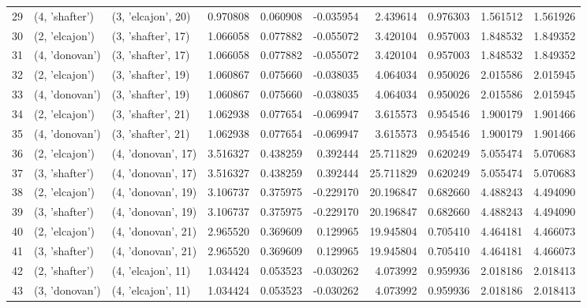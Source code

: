 \begin{tabular}{lllrrrrrrr}
29 &   (4, 'shafter') &  (3, 'elcajon', 20) &  0.970808 &   0.060908 & -0.035954 &   2.439614 &  0.976303 &   1.561512 &  1.561926 \\
30 &   (2, 'elcajon') &  (3, 'shafter', 17) &  1.066058 &   0.077882 & -0.055072 &   3.420104 &  0.957003 &   1.848532 &  1.849352 \\
31 &   (4, 'donovan') &  (3, 'shafter', 17) &  1.066058 &   0.077882 & -0.055072 &   3.420104 &  0.957003 &   1.848532 &  1.849352 \\
32 &   (2, 'elcajon') &  (3, 'shafter', 19) &  1.060867 &   0.075660 & -0.038035 &   4.064034 &  0.950026 &   2.015586 &  2.015945 \\
33 &   (4, 'donovan') &  (3, 'shafter', 19) &  1.060867 &   0.075660 & -0.038035 &   4.064034 &  0.950026 &   2.015586 &  2.015945 \\
34 &   (2, 'elcajon') &  (3, 'shafter', 21) &  1.062938 &   0.077654 & -0.069947 &   3.615573 &  0.954546 &   1.900179 &  1.901466 \\
35 &   (4, 'donovan') &  (3, 'shafter', 21) &  1.062938 &   0.077654 & -0.069947 &   3.615573 &  0.954546 &   1.900179 &  1.901466 \\
36 &   (2, 'elcajon') &  (4, 'donovan', 17) &  3.516327 &   0.438259 &  0.392444 &  25.711829 &  0.620249 &   5.055474 &  5.070683 \\
37 &   (3, 'shafter') &  (4, 'donovan', 17) &  3.516327 &   0.438259 &  0.392444 &  25.711829 &  0.620249 &   5.055474 &  5.070683 \\
38 &   (2, 'elcajon') &  (4, 'donovan', 19) &  3.106737 &   0.375975 & -0.229170 &  20.196847 &  0.682660 &   4.488243 &  4.494090 \\
39 &   (3, 'shafter') &  (4, 'donovan', 19) &  3.106737 &   0.375975 & -0.229170 &  20.196847 &  0.682660 &   4.488243 &  4.494090 \\
40 &   (2, 'elcajon') &  (4, 'donovan', 21) &  2.965520 &   0.369609 &  0.129965 &  19.945804 &  0.705410 &   4.464181 &  4.466073 \\
41 &   (3, 'shafter') &  (4, 'donovan', 21) &  2.965520 &   0.369609 &  0.129965 &  19.945804 &  0.705410 &   4.464181 &  4.466073 \\
42 &   (2, 'shafter') &  (4, 'elcajon', 11) &  1.034424 &   0.053523 & -0.030262 &   4.073992 &  0.959936 &   2.018186 &  2.018413 \\
43 &   (3, 'donovan') &  (4, 'elcajon', 11) &  1.034424 &   0.053523 & -0.030262 &   4.073992 &  0.959936 &   2.018186 &  2.018413 \\

\end{tabular}

